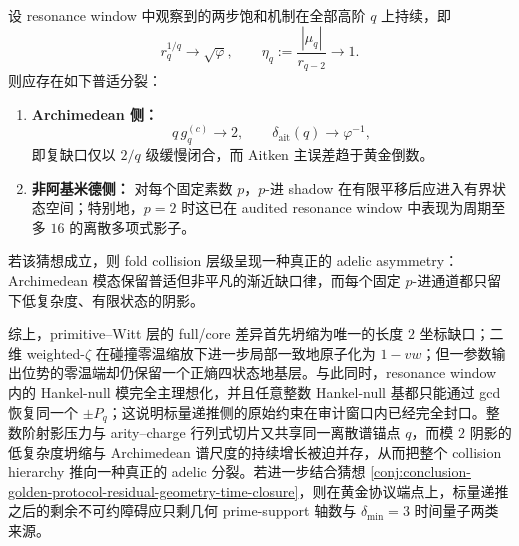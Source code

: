 \begin{conjecture}\label{conj:conclusion-fold-collision-universal-adelic-asymmetry}
设 resonance window 中观察到的两步饱和机制在全部高阶 \(q\) 上持续，即
\[
r_q^{1/q}\to \sqrt{\varphi},
\qquad
\eta_q:=\frac{|\mu_q|}{r_{q-2}}\to 1.
\]
则应存在如下普适分裂：
\begin{enumerate}
\item \textbf{Archimedean 侧：}
\[
q\,g_q^{(c)}\to 2,
\qquad
\delta_{\mathrm{ait}}(q)\to \varphi^{-1},
\]
即复缺口仅以 \(2/q\) 级缓慢闭合，而 Aitken 主误差趋于黄金倒数。
\item \textbf{非阿基米德侧：}
对每个固定素数 \(p\)，\(p\)-进 shadow 在有限平移后应进入有界状态空间；特别地，\(p=2\) 时这已在 audited resonance window 中表现为周期至多 \(16\) 的离散多项式影子。
\end{enumerate}
若该猜想成立，则 fold collision 层级呈现一种真正的 adelic asymmetry：Archimedean 模态保留普适但非平凡的渐近缺口律，而每个固定 \(p\)-进通道都只留下低复杂度、有限状态的阴影。
\end{conjecture}

综上，primitive--Witt 层的 full/core 差异首先坍缩为唯一的长度 \(2\) 坐标缺口；二维 weighted-\(\zeta\) 在碰撞零温缩放下进一步局部一致地原子化为 \(1-vw\)；但一参数输出位势的零温端却仍保留一个正熵四状态地基层。与此同时，resonance window 内的 Hankel-null 模完全主理想化，并且任意整数 Hankel-null 基都只能通过 gcd 恢复同一个 \(\pm P_q\)；这说明标量递推侧的原始约束在审计窗口内已经完全封口。整数阶射影压力与 arity--charge 行列式切片又共享同一离散谱锚点 \(q\)，而模 \(2\) 阴影的低复杂度坍缩与 Archimedean 谱尺度的持续增长被迫并存，从而把整个 collision hierarchy 推向一种真正的 adelic 分裂。若进一步结合猜想 \ref{conj:conclusion-golden-protocol-residual-geometry-time-closure}，则在黄金协议端点上，标量递推之后的剩余不可约障碍应只剩几何 prime-support 轴数与 \(\delta_{\min}=3\) 时间量子两类来源。

\endinput
